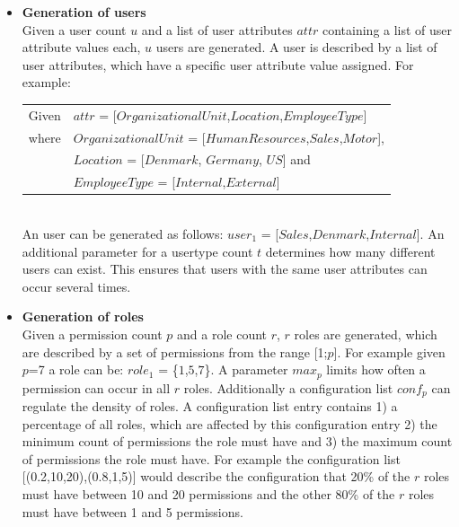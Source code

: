 \begin{itemize}
    \item \textbf{Generation of users}\\
    Given a user count $u$ and a list of user attributes $attr$ containing a list of user attribute values each, $u$ users are generated. A user is described by a list of user attributes, which have a specific user attribute value assigned. For example:\\
    \begin{listliketab}
        \begin{tabular}{ll}
            Given   &  $attr$ = [$OrganizationalUnit$,$Location$,$EmployeeType$]\\
            where   &  $OrganizationalUnit$ = [$HumanResources$,$Sales$,$Motor$],\\
                    &  $Location$ = [$Denmark$, $Germany$, $US$] and\\
                    &  $EmployeeType$ = [$Internal$,$External$]\\
        \end{tabular}
    \end{listliketab}\\
    An user can be generated as follows: $user_1$ = [$Sales$,$Denmark$,$Internal$]. An additional parameter for a usertype count $t$ determines how many different users can exist. This ensures that users with the same user attributes can occur several times.
    
    \item \textbf{Generation of roles}\\
    Given a permission count $p$ and a role count $r$, $r$ roles are generated, which are described by a set of permissions from the range [1;$p$]. For example given $p$=7 a role can be: $role_1$ = \{$1$,$5$,$7$\}. A parameter $max_p$ limits how often a permission can occur in all $r$ roles. Additionally a configuration list $conf_p$ can regulate the density of roles. A configuration list entry contains 1) a percentage of all roles, which are affected by this configuration entry 2) the minimum count of permissions the role must have and 3) the maximum count of permissions the role must have. For example the configuration list [(0.2,10,20),(0.8,1,5)] would describe the configuration that 20\% of the $r$ roles must have between 10 and 20 permissions and the other 80\% of the $r$ roles must have between 1 and 5 permissions.
    

\end{itemize}

